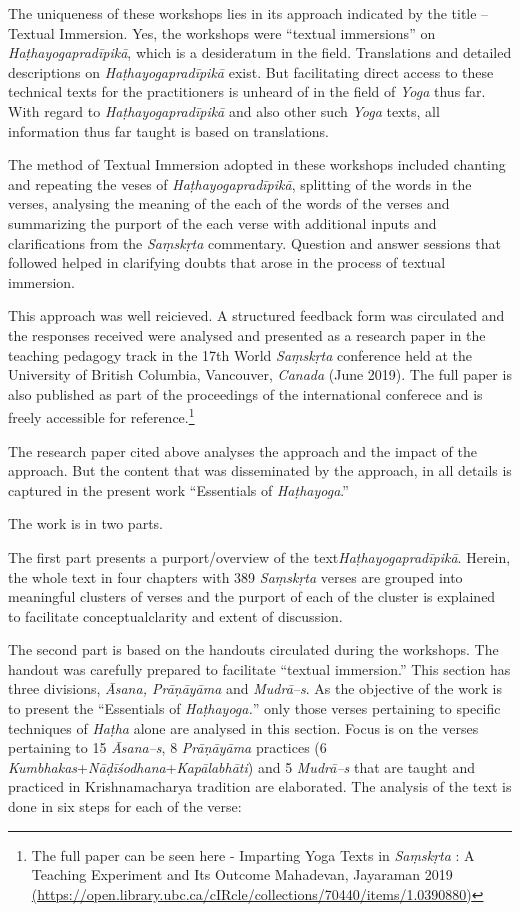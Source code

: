The uniqueness of these workshops lies in its approach indicated by the title – Textual Immersion. Yes, the workshops were “textual immersions” on \textit{Haṭhayogapradīpikā}, which is a desideratum in the field. Translations and detailed descriptions on \textit{Haṭhayogapradīpikā} exist. But facilitating direct access to these technical texts for the practitioners is unheard of in the field of \textit{Yoga} thus far. With regard to \textit{Haṭhayogapradīpikā} and also other such \textit{Yoga} texts, all information thus far taught is based on translations.
\smallskip

The method of Textual Immersion adopted in these workshops included chanting and repeating the veses of \textit{Haṭhayogapradīpikā}, splitting of the words in the verses, analysing the meaning of the each of the words of the verses and summarizing the purport of the each verse with additional inputs and clarifications from the \textit{Saṃskṛta} commentary. Question and answer sessions that followed helped in clarifying doubts that arose in the process of textual immersion.
\smallskip

This approach was well reicieved. A structured feedback form was circulated and the responses received were  analysed and presented as a research paper in the teaching pedagogy track in the 17th World \textit{Saṃskṛta} conference held at the University of British Columbia, Vancouver, \textit{Canada} (June 2019). The full paper is also published as part of the proceedings of the international conferece and is freely accessible for reference.\footnote{The full paper can be seen here - Imparting Yoga Texts in \textit{Saṃskṛta} : A Teaching Experiment and Its Outcome Mahadevan, Jayaraman 2019 \url{(https://open.library.ubc.ca/cIRcle/collections/70440/items/1.0390880)}}
\smallskip

The research paper cited above analyses the approach and the impact of the approach. But the content that was disseminated by the approach, in all details is captured in the present work “Essentials of \textit{Haṭhayoga}.”

The work is in two parts.

The first part presents a purport/overview of the text\break \textit{Haṭhayogapradīpikā}. Herein, the whole text in four chapters with 389 \textit{Saṃskṛta} verses are grouped into meaningful clusters of verses and the purport of each of the cluster is explained to facilitate conceptual\break clarity and extent of discussion.

The second part is based on the handouts circulated during the workshops. The handout was carefully prepared to facilitate “textual immersion.” This section has three divisions, \textit{Āsana, Prāṇāyāma} and \textit{Mudrā–s}. As the objective of the work is to present the “Essentials of \textit{Haṭhayoga.}” only those verses pertaining to specific techniques of \textit{Haṭha} alone are analysed in this section. Focus is on the verses pertaining to 15 \textit{Āsana–s}, 8 \textit{Prāṇāyāma} practices (6 \textit{Kumbhakas}+\textit{Nāḍīśodhana}+\textit{Kapālabhāti}) and 5 \textit{Mudrā–s} that are taught and practiced in Krishnamacharya tradition are elaborated. The analysis of the text is done in six steps for each of the verse:

